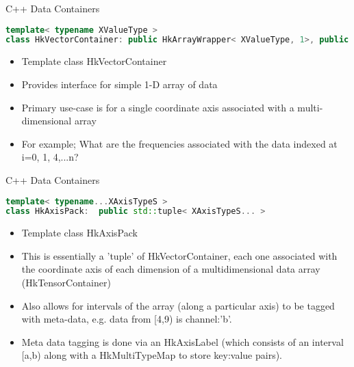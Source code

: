 \documentclass[xcolor=svgnames]{beamer}
\begin{document}
\begin{frame}[fragile]{C++ Data Containers}

\begin{lstlisting}[language=C++,basicstyle=\ttfamily\tiny,keywordstyle=\color{red}]
template< typename XValueType >
class HkVectorContainer: public HkArrayWrapper< XValueType, 1>, public HkNamed
\end{lstlisting}

\begin{itemize}
\item Template class HkVectorContainer
\item Provides interface for simple 1-D array of data
\item Primary use-case is for a single coordinate axis associated with a multi-dimensional array
\item For example; What are the frequencies associated with the data indexed at i=0, 1, 4,...n?
\end{itemize}

\end{frame}


\begin{frame}[fragile]{C++ Data Containers}

\begin{lstlisting}[language=C++,basicstyle=\ttfamily\tiny,keywordstyle=\color{red}]
template< typename...XAxisTypeS >
class HkAxisPack:  public std::tuple< XAxisTypeS... >
\end{lstlisting}

\begin{itemize}
\item Template class HkAxisPack
\item This is essentially a 'tuple' of HkVectorContainer, each one associated with the coordinate axis of each dimension of a multidimensional data array (HkTensorContainer)
\item Also allows for intervals of the array (along a particular axis) to be tagged with meta-data, e.g. data from [4,9) is channel:'b'.
\item Meta data tagging is done via an HkAxisLabel (which consists of an interval [a,b) along with a HkMultiTypeMap to store key:value pairs).
\end{itemize}

\end{frame}
\end{document}
